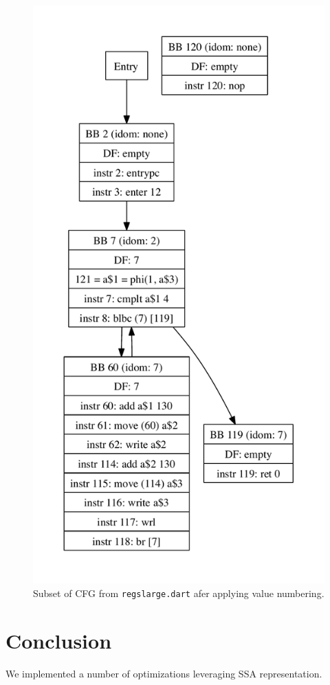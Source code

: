 \documentclass[10pt,twocolumn]{article}
\begin{document}
\begin{figure}
\begin{center}
\vspace{-1in}
  \includegraphics[height=0.75\paperheight]{figs/andre3.pdf}
\begin{minipage}{0.95\columnwidth}
  \caption{\label{fig:regslarge-gce} Subset of CFG from \texttt{regslarge.dart} afer applying value numbering.}
\end{minipage}
\end{center}
\end{figure}

\section{Conclusion}

We implemented a number of optimizations leveraging SSA representation.



\end{document}
